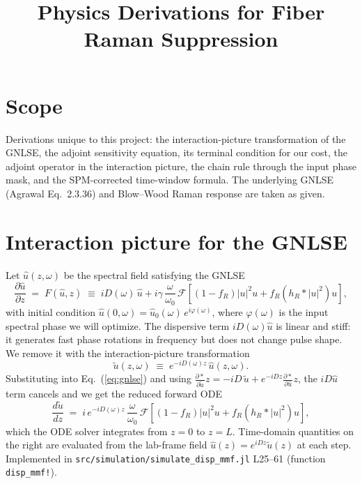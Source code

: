 \documentclass[11pt]{article}
\title{Physics Derivations for Fiber Raman Suppression}
\author{}
\date{}
\providecommand{\pdv}[2]{\frac{\partial #1}{\partial #2}}
\providecommand{\dv}[2]{\frac{d #1}{d #2}}
\newcommand{\uhat}{\hat{u}}
\newcommand{\utilde}{\tilde{u}}
\begin{document}
\maketitle

\section*{Scope}

Derivations unique to this project: the interaction-picture transformation of
the GNLSE, the adjoint sensitivity equation, its terminal condition for our
cost, the adjoint operator in the interaction picture, the chain rule through
the input phase mask, and the SPM-corrected time-window formula. The
underlying GNLSE (Agrawal Eq.~2.3.36) and Blow--Wood Raman response are taken
as given.

\section{Interaction picture for the GNLSE}

Let $\uhat(z,\omega)$ be the spectral field satisfying the GNLSE
\begin{equation}
  \pdv{\uhat}{z} \;=\; F(\uhat,z)
  \;\equiv\; iD(\omega)\,\uhat
   + i\gamma\,\frac{\omega}{\omega_0}\,
     \mathcal{F}\!\left[(1-f_R)|u|^2 u + f_R(h_R \ast |u|^2)u\right],
  \label{eq:gnlse}
\end{equation}
with initial condition $\uhat(0,\omega) = \uhat_0(\omega)\,e^{i\varphi(\omega)}$,
where $\varphi(\omega)$ is the input spectral phase we will optimize. The
dispersive term $iD(\omega)\uhat$ is linear and stiff: it generates fast phase
rotations in frequency but does not change pulse shape. We remove it with the
interaction-picture transformation
\begin{equation}
  \utilde(z,\omega) \;\equiv\; e^{-iD(\omega)z}\,\uhat(z,\omega).
  \label{eq:ip_transform}
\end{equation}
Substituting into Eq.~(\ref{eq:gnlse}) and using
$\pdv*{\utilde}{z} = -iD\,\utilde + e^{-iDz}\pdv*{\uhat}{z}$, the $iD\uhat$ term
cancels and we get the reduced forward ODE
\begin{equation}
  \dv{\utilde}{z}
  \;=\; i\,e^{-iD(\omega)z}\,\frac{\omega}{\omega_0}\,
        \mathcal{F}\!\left[(1-f_R)|u|^2 u + f_R(h_R \ast |u|^2)u\right],
  \label{eq:forward_ip}
\end{equation}
which the ODE solver integrates from $z=0$ to $z=L$. Time-domain quantities on
the right are evaluated from the lab-frame field $\uhat(z) = e^{iDz}\utilde(z)$
at each step. Implemented in \texttt{src/simulation/simulate\_disp\_mmf.jl}
L25--61 (function \texttt{disp\_mmf!}).
\end{document}
